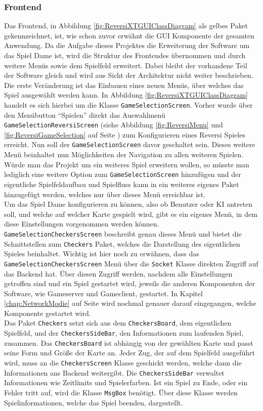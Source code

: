 \documentclass[12pt,a4paper,bibliography=totocnumbered,listof=totocnumbered]{article}
\begin{document}
\subsubsection{Frontend}
Das Frontend, in Abbildung \ref{fig:ReversiXTGUIClassDiagram} als gelbes Paket gekennzeichnet, ist, wie schon zuvor erwähnt die
\ac{GUI} Komponente der gesamten Anwendung. Da die Aufgabe dieses Projektes die Erweiterung der Software um das Spiel Dame ist, 
wird die Struktur des Frontendes übernommen und durch weitere Menüs sowie dem Spielfeld erweitert. Dabei bleibt der vorhandene Teil der Software gleich 
und wird aus Sicht der Architektur nicht weiter beschrieben. 
\\
Die erste Veränderung ist das Einbauen eines neuen Menüs, über welches das Spiel ausgewählt werden kann. In Abbildung \ref{fig:ReversiXTGUIClassDiagram} 
handelt es sich hierbei um die Klasse \texttt{GameSelectionScreen}. Vorher wurde über den Menübutton ``Spielen'' direkt das Auswahlmenü \texttt{GameSelectionReversiScreen}
(siehe Abbildung \ref{fig:ReversiMenu} und \ref{fig:ReversiGameSelection} auf Seite \pageref{fig:ReversiMenu}) zum Konfigurieren eines Reversi Spieles erreicht. 
Nun soll der \texttt{GameSelectionScreen} davor geschaltet sein. Dieses weitere Menü beinhaltet nun Möglichkeiten der Navigation zu allen weiteren Spielen.
Würde man das Projekt um ein weiteres Spiel erweitern wollen, so müsste man lediglich eine weitere Option zum \texttt{GameSelectionScreen} hinzufügen 
und der eigentliche Spielfeldaufbau und Spielfluss kann in ein weiteres eigenes Paket hinzugefügt werden, welches nur über dieses Menü erreichbar ist.
\\
Um das Spiel Dame konfigurieren zu können, also ob Benutzer oder KI antreten soll, und welche auf welcher Karte gespielt wird, gibt es ein eigenes Menü, 
in dem diese Einstellungen vorgenommen werden können. \texttt{GameSelectionCheckersScreen} beschreibt genau dieses Menü und bietet die Schnittstellen 
zum \texttt{Checkers} Paket, welches die Darstellung des eigentlichen Spieles beinhaltet. Wichtig ist hier noch zu erwähnen, dass das \texttt{GameSelectionCheckersScreen}
Menü über die \texttt{Socket} Klasse direkten Zugriff auf das Backend hat. Über diesen Zugriff werden, nachdem alle Einstellungen getroffen sind und ein Spiel
gestartet wird, jeweils die anderen Komponenten der Software, wie Gameserver und Gameclient, gestartet. In Kapitel \ref{chap:NetworkModie} auf Seite \pageref{chap:NetworkModie} 
wird nochmal genauer darauf eingegangen, welche Komponente gestartet wird.
\\
Das Paket \texttt{Checkers} setzt sich aus dem \texttt{CheckersBoard}, dem eigentlichen Spielfeld, und der \texttt{CheckersSideBar}, den Informationen zum laufenden Spiel, zusammen. 
Das \texttt{CheckersBoard} ist abhängig von der gewählten Karte und passt seine Form und Größe der Karte an. Jeder Zug, der auf dem Spielfeld ausgeführt wird, muss an 
die \texttt{CheckersScreen} Klasse geschickt werden, welche dann die Informationen ans Backend weitergibt.
Die \texttt{CheckersSideBar} verwaltet Informationen wie Zeitlimits und Spielerfarben. 
Ist ein Spiel zu Ende, oder ein Fehler tritt auf, wird die Klasse \texttt{MsgBox} benötigt. Über diese Klasse werden Spielinformationen, welche das Spiel beenden, 
dargestellt.
\end{document}
